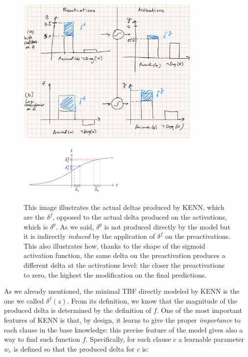 \begin{figure}[h!]
	\centering
	\includegraphics[width=0.8\textwidth]{figures/preac_deltas_example.jpg}
	\includegraphics[width=0.5\textwidth]{figures/sigmoid_shape_example.png}
	\caption{This image illustrates the actual deltas produced by KENN, which are the $\delta^f$, opposed to the actual delta produced on the activations, which is $\delta^g$. As we said, $\delta^g$ is not produced directly by the model but it is indirectly \textit{induced} by the application of $\delta^f$ on the preactivations. This also illustrates how, thanks to the shape of the sigmoid activation function, the same delta on the preactivation produces a different delta at the activations level: the closer the preactivations to zero, the highest the modification on the final predictions. }
	\label{fig:preacs_deltas_example}
\end{figure}

As we already mentioned, the minimal TBF directly modeled by KENN is the one we called $\delta^f(z)$. From its definition, we know that the magnitude of the produced delta is determined by the definition of $f$. One of the most important features of KENN is that, by design, it learns to give the proper \textit{importance} to each clause in the base knowledge: this precise feature of the model gives also a way to find such function $f$. Specifically, for each clause $c$ a learnable parameter $w_c$ is defined so that the produced delta for $c$ is:


